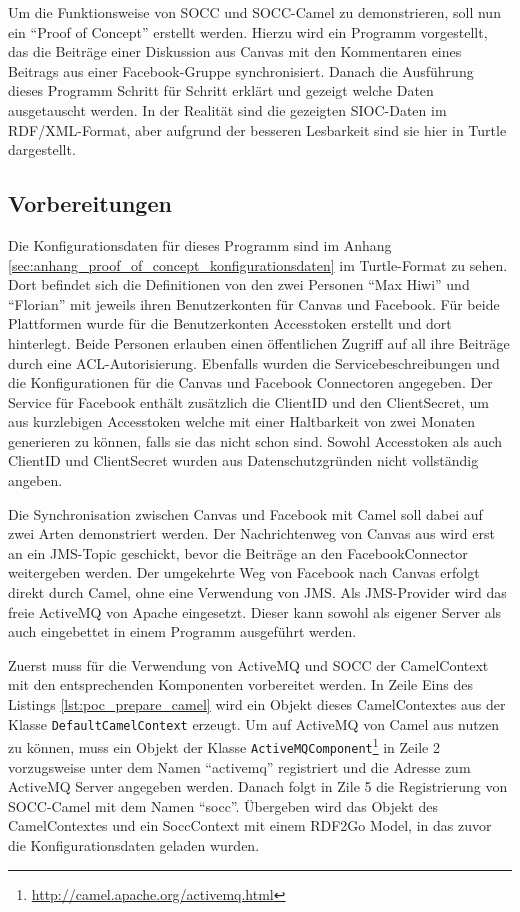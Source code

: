Um die Funktionsweise von SOCC und SOCC-Camel zu demonstrieren, soll nun ein \enquote{Proof of Concept} erstellt werden. Hierzu wird ein Programm vorgestellt, das die Beiträge einer Diskussion aus Canvas mit den Kommentaren eines Beitrags aus einer Facebook-Gruppe synchronisiert. Danach die Ausführung dieses Programm Schritt für Schritt erklärt und gezeigt welche Daten ausgetauscht werden. In der Realität sind die gezeigten SIOC-Daten im RDF/XML-Format, aber aufgrund der besseren Lesbarkeit sind sie hier in Turtle dargestellt.

\subsection{Vorbereitungen} %
\label{sub:vorbereitungen}

Die Konfigurationsdaten für dieses Programm sind im Anhang \ref{sec:anhang_proof_of_concept_konfigurationsdaten} im Turtle-Format zu sehen. Dort befindet sich die Definitionen von den zwei Personen \enquote{Max Hiwi} und \enquote{Florian} mit jeweils ihren Benutzerkonten für Canvas und Facebook. Für beide Plattformen wurde für die Benutzerkonten Accesstoken erstellt und dort hinterlegt. Beide Personen erlauben einen öffentlichen Zugriff auf all ihre Beiträge durch eine ACL-Autorisierung. Ebenfalls wurden die Servicebeschreibungen und die Konfigurationen für die Canvas und Facebook Connectoren angegeben. Der Service für Facebook enthält zusätzlich die ClientID und den ClientSecret, um aus kurzlebigen Accesstoken welche mit einer Haltbarkeit von zwei Monaten generieren zu können, falls sie das nicht schon sind. Sowohl Accesstoken als auch ClientID und ClientSecret wurden aus Datenschutzgründen nicht vollständig angeben.

Die Synchronisation zwischen Canvas und Facebook mit Camel soll dabei auf zwei Arten demonstriert werden. Der Nachrichtenweg von Canvas aus wird erst an ein JMS-Topic geschickt, bevor die Beiträge an den FacebookConnector weitergeben werden. Der umgekehrte Weg von Facebook nach Canvas erfolgt direkt durch Camel, ohne eine Verwendung von JMS. Als JMS-Provider wird das freie ActiveMQ von Apache eingesetzt. Dieser kann sowohl als eigener Server als auch eingebettet in einem Programm ausgeführt werden.

Zuerst muss für die Verwendung von ActiveMQ und SOCC der CamelContext mit den entsprechenden Komponenten vorbereitet werden. In Zeile Eins des Listings \ref{lst:poc_prepare_camel} wird ein Objekt dieses CamelContextes aus der Klasse \texttt{DefaultCamelContext} erzeugt. Um auf ActiveMQ von Camel aus nutzen zu können, muss ein Objekt der Klasse \texttt{ActiveMQComponent}\footnote{\url{http://camel.apache.org/activemq.html}} in Zeile 2 vorzugsweise unter dem Namen \enquote{activemq} registriert und die Adresse zum ActiveMQ Server angegeben werden. Danach folgt in Zile 5 die Registrierung von SOCC-Camel mit dem Namen \enquote{socc}. Übergeben wird das Objekt des CamelContextes und ein SoccContext mit einem RDF2Go Model, in das zuvor die Konfigurationsdaten geladen wurden.  

